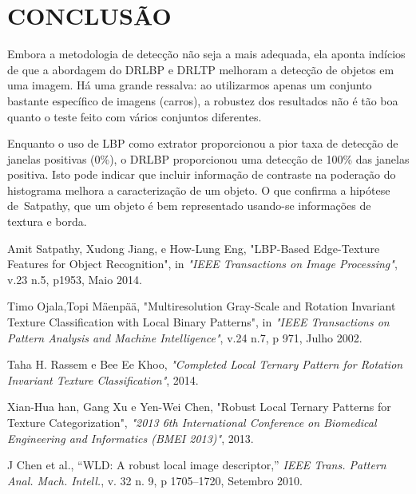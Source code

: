 \documentclass[a4paper,twocolumn]{article}
\begin{document}


\section{CONCLUSÃO}
Embora a metodologia de detecção não seja a mais adequada, ela aponta indícios de que a abordagem do DRLBP e DRLTP melhoram a detecção de objetos em uma imagem. Há uma grande ressalva: ao utilizarmos apenas um conjunto bastante específico de imagens (carros), a robustez dos resultados não é tão boa quanto o teste feito com vários conjuntos diferentes. 

Enquanto o uso de LBP como extrator proporcionou a pior taxa de detecção de janelas positivas (0\%), o DRLBP proporcionou uma detecção de 100\% das janelas positiva. Isto pode indicar que incluir informação de contraste na poderação do histograma melhora a caracterização de um objeto. O que confirma a hipótese de Satpathy, que um objeto é bem representado usando-se informações de textura e borda.

 


\begin{thebibliography}{5}
      Amit Satpathy, Xudong Jiang, e How-Lung Eng,
      "LBP-Based Edge-Texture Features for Object Recognition",
      in \emph{"IEEE Transactions on Image Processing"},
      v.23 n.5,
      p1953,
      Maio 2014.

     Timo Ojala,Topi Mäenpää,
     "Multiresolution Gray-Scale and Rotation Invariant Texture Classification with Local Binary Patterns",
     in \emph{"IEEE Transactions on Pattern Analysis and Machine Intelligence"},
     v.24 n.7,
     p 971,
     Julho 2002.

     Taha H. Rassem e Bee Ee Khoo,
     \emph{"Completed Local Ternary Pattern for Rotation Invariant Texture Classification"},
     2014.
      
     Xian-Hua han, Gang Xu e Yen-Wei Chen,
     "Robust Local Ternary Patterns for Texture Categorization",
     \emph{"2013 6th International Conference on Biomedical Engineering and Informatics (BMEI 2013)"},
     2013.

     J Chen et al., 
     “WLD: A robust local image descriptor,” 
     \emph{IEEE Trans. Pattern Anal. Mach. Intell.}, 
     v. 32 n. 9, 
     p 1705–1720, 
     Setembro 2010.

     
     
     
\end{thebibliography}
\end{document}
